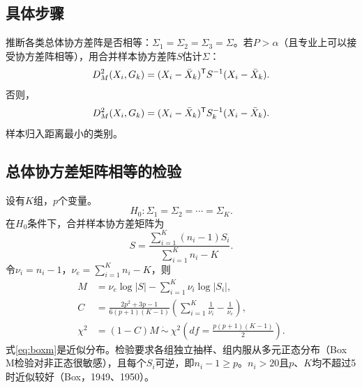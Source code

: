 \subsection{具体步骤}
推断各类总体协方差阵是否相等：$\Sigma_1=\Sigma_2=\Sigma_3=\Sigma$。若$P>\alpha$（且专业上可以接受协方差阵相等），用合并样本协方差阵$S$估计$\Sigma$：
\begin{equation}
D_M^2(X_i,G_k)=(X_i-\bar X_k)^{\mathsf T} S^{-1}(X_i-\bar X_k).
\end{equation}
否则，
\begin{equation}
D_M^2(X_i,G_k)=(X_i-\bar X_k)^{\mathsf T} S_k^{-1}(X_i-\bar X_k).
\end{equation}
样本归入距离最小的类别。
\subsection{总体协方差矩阵相等的检验}
设有$K$组，$p$个变量。
\[
H_0:\Sigma_1=\Sigma_2=\cdots=\Sigma_K.
\]
在$H_0$条件下，合并样本协方差矩阵为
\[
S=\frac{\sum_{i=1}^K(n_i-1)S_i}{\sum_{i=1}^Kn_i-K}.
\]
令$\nu_i=n_i-1$，$\nu_e=\sum_{i=1}^Kn_i-K$，则
\begin{align}
M&=\nu_e\log|S|-\sum_{i=1}^K\nu_i\log|S_i|,\\
C&=\frac{2p^2+3p-1}{6(p+1)(K-1)}\left(\sum_{i=1}^K\frac1{\nu_i}-\frac1{\nu_e}\right),\\
\chi^2&=(1-C)M\ \dot\sim\ \chi^2\left(df=\frac{p(p+1)(K-1)}{2}\right).\label{eq:boxm}
\end{align}
式\eqref{eq:boxm}是近似分布。检验要求各组独立抽样、组内服从多元正态分布（Box M检验对非正态很敏感），且每个$S_i$可逆，即$n_i-1\geqslant p$。$n_i>20$且$p$、$K$均不超过5时近似较好（Box，1949、1950）。
